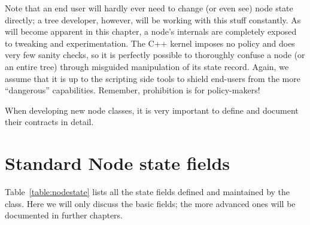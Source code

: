   Note that an end user will hardly ever need to change (or even see) node
  state directly; a tree developer, however, will be working with this stuff
  constantly. As will become apparent in this chapter, a node's internals are
  completely exposed to tweaking and experimentation. The C++ kernel imposes no
  policy and does very few sanity checks, so it is perfectly possible  to
  thoroughly confuse a node (or an entire tree) through misguided  manipulation
  of its state record. Again, we assume that it is up to the scripting side
  tools to shield end-users from the more ``dangerous'' capabilities. Remember,
  prohibition is for policy-makers!

  When developing new node classes, it is very important to define and document
  their contracts in detail.
  
\section{Standard Node state fields}

  Table~\ref{table:nodestate} lists all the state fields defined and maintained
  by the  class. Here we will only discuss the basic fields; the more
  advanced ones will be documented in further chapters.

